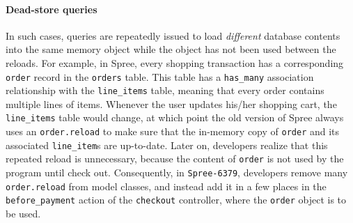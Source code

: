 \paragraph{\bf{Dead-store queries}}
In such cases, queries are repeatedly issued to load {\it different} database contents into the same memory object while the object has not been used between the reloads.
 For example, in Spree, every shopping transaction has a corresponding
 {\tt order} record in the {\tt orders} table. This table has a
 {\tt has\_many} association relationship with the 
 {\tt line\_items} table, meaning that every order  contains
 multiple lines of items. Whenever the user updates his/her shopping
 cart, the {\tt line\_items} table would change, at which point the old version of Spree always uses an {\tt order.reload} to make 
 sure that the in-memory copy of {\tt order} and its associated 
 {\tt line\_item}s are up-to-date. Later on, developers realize that
 this repeated reload is unnecessary, because the content of 
 {\tt order} is not used by the program until check out.
 Consequently, in {\tt Spree-6379}, developers remove many 
 {\tt order.reload} from model classes, and instead add it in a few places in the {\tt before\_payment} action of the
 {\tt checkout} controller, where the {\tt order} object is to be used.

